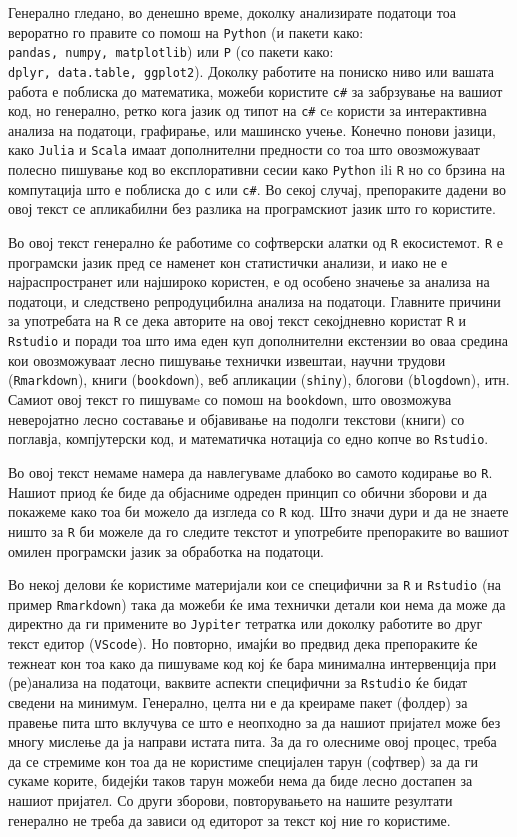 \documentclass[
]{book}
\begin{document}
Генерално гледано, во денешно време, доколку анализирате податоци тоа вероратно го правите со помош на \texttt{Python} (и пакети како: \texttt{pandas,\ numpy,\ matplotlib}) или \texttt{Р} (со пакети како: \texttt{dplyr,\ data.table,\ ggplot2}). Доколку работите на пониско ниво или вашата работа е поблиска до математика, можеби користите \texttt{c\#} за забрзување на вашиот код, но генерално, ретко кога јазик од типот на \texttt{c\#} сe користи за интерактивна анализа на податоци, графирање, или машинско учење. Конечно понови јазици, како \texttt{Julia} и \texttt{Scala} имаат дополнителни предности со тоа што овозможуваат полесно пишување код во експлоративни сесии како \texttt{Python} ili \texttt{R} но со брзина на компутација што е поблиска до \texttt{c} или \texttt{c\#}. Во секој случај, препораките дадени во овој текст се апликабилни без разлика на програмскиот јазик што го користите.

Во овој текст генерално ќе работиме со софтверски алатки од \texttt{R} екосистемот. \texttt{R} е програмски јазик пред се наменет кон статистички анализи, и иако не е најраспространет или најшироко користен, е од особено значење за анализа на податоци, и следствено репродуцибилна анализа на податоци. Главните причини за употребата на \texttt{R} се дека авторите на овој текст секојдневно користат \texttt{R} и \texttt{Rstudio} и поради тоа што има еден куп дополнителни екстензии во оваа средина кои овозможуваат лесно пишување технички извештаи, научни трудови (\texttt{Rmarkdown}), книги (\texttt{bookdown}), веб апликации (\texttt{shiny}), блогови (\texttt{blogdown}), итн. Самиот овој текст го пишувамe со помош на \texttt{bookdown}, што овозможува неверојатно лесно составање и објавивање на подолги текстови (книги) со поглавја, компјутерски код, и математичка нотација со едно копче во \texttt{Rstudio}.

Во овој текст немаме намера да навлегуваме длабоко во самото кодирање во \texttt{R}. Нашиот приод ќе биде да објасниме одреден принцип со обични зборови и да покажеме како тоа би можело да изгледа со \texttt{R} код. Што значи дури и да не знаете ништо за \texttt{R} би можеле да го следите текстот и употребите препораките во вашиот омилен програмски јазик за обработка на податоци.

Во некој делови ќе користиме материјали кои се специфични за \texttt{R} и \texttt{Rstudio} (на пример \texttt{Rmarkdown}) така да можеби ќе има технички детали кои нема да може да директно да ги примените во \texttt{Jypiter} тетратка или доколку работите во друг текст едитор (\texttt{VScode}). Но повторно, имајќи во предвид дека препораките ќе тежнеат кон тоа како да пишуваме код кој ќе бара минимална интервенција при (ре)анализа на податоци, ваквите аспекти специфични за \texttt{Rstudio} ќе бидат сведени на минимум. Генерално, целта ни е да креираме пакет (фолдер) за правење пита што вклучува се што е неопходно за да нашиот пријател може без многу мислење да ја направи истата пита. За да го олесниме овој процес, треба да се стремиме кон тоа да не користиме специјален тарун (софтвер) за да ги сукаме корите, бидејќи таков тарун можеби нема да биде лесно достапен за нашиот пријател. Со други зборови, повторувањето на нашите резултати генерално не треба да зависи од едиторот за текст кој ние го користиме.
\end{document}
